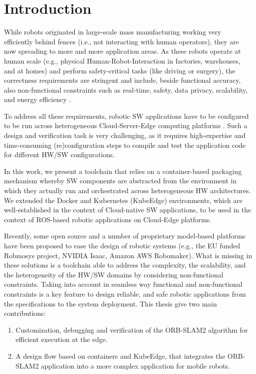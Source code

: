\chapter{Introduction}
While robots originated in large-scale mass manufacturing working very efficiently behind fences (i.e., not interacting with human operators), they are now spreading to more and more application areas. As these robots operate at human scale (e.g., physical Human-Robot-Interaction in factories, warehouses, and at homes) and perform safety-critical tasks (like driving or surgery), the correctness requirements are stringent and include, beside functional accuracy, also non-functional constraints such as real-time, safety, data privacy, scalability, and energy efficiency \cite{robotchallanges}.

To address all these requirements, robotic SW applications have to be configured to be run across heterogeneous Cloud-Server-Edge computing platforms \cite{deepedgerev}. Such a design and verification task is very challenging, as it requires high-expertise and time-consuming (re)configuration steps to compile and test the application code for different HW/SW configurations.

In this work, we present a toolchain that relies on a container-based packaging mechanism whereby SW components are abstracted from the environment in which they actually run and orchestrated across heterogeneous HW architectures. We extended the Docker and Kubernetes (KubeEdge) environments, which are well-established in the context of Cloud-native SW applications, to be used in the context of ROS-based robotic applications on Cloud-Edge platforms.

Recently, some open source and a number of proprietary model-based platforms have been proposed to ease the design of robotic systems (e.g., the EU funded Robmosys project, NVIDIA Isaac, Amazon AWS Robomaker). What is missing in these solutions is a toolchain able to address the complexity, the scalability, and the heterogeneity of the HW/SW domains by considering non-functional constraints. Taking into account in seamless way functional and non-functional constraints is a key feature to design reliable, and safe robotic applications from the specifications to the system deployment.
This thesis give two main contributions:
\begin{enumerate}
	\item Customization, debugging and verification of the ORB-SLAM2 algorithm for efficient execution at the edge.
	\item A design flow based on containers and KubeEdge, that integrates the ORB-SLAM2 application into a more complex application for mobile robots. 
\end{enumerate}

